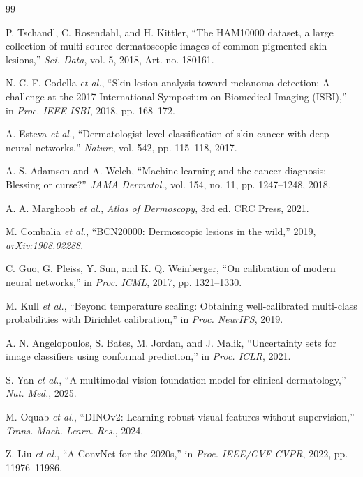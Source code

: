 \documentclass[journal]{IEEEtran}
\begin{document}
\begin{thebibliography}{99}

 P. Tschandl, C. Rosendahl, and H. Kittler, ``The HAM10000 dataset, a large collection of multi-source dermatoscopic images of common pigmented skin lesions,'' \emph{Sci. Data}, vol. 5, 2018, Art. no. 180161.

 N. C. F. Codella \emph{et al.}, ``Skin lesion analysis toward melanoma detection: A challenge at the 2017 International Symposium on Biomedical Imaging (ISBI),'' in \emph{Proc. IEEE ISBI}, 2018, pp. 168--172.

 A. Esteva \emph{et al.}, ``Dermatologist-level classification of skin cancer with deep neural networks,'' \emph{Nature}, vol. 542, pp. 115--118, 2017.

 A. S. Adamson and A. Welch, ``Machine learning and the cancer diagnosis: Blessing or curse?'' \emph{JAMA Dermatol.}, vol. 154, no. 11, pp. 1247--1248, 2018.

 A. A. Marghoob \emph{et al.}, \emph{Atlas of Dermoscopy}, 3rd ed. CRC Press, 2021.

 M. Combalia \emph{et al.}, ``BCN20000: Dermoscopic lesions in the wild,'' 2019, \emph{arXiv:1908.02288}.

 C. Guo, G. Pleiss, Y. Sun, and K. Q. Weinberger, ``On calibration of modern neural networks,'' in \emph{Proc. ICML}, 2017, pp. 1321--1330.

 M. Kull \emph{et al.}, ``Beyond temperature scaling: Obtaining well-calibrated multi-class probabilities with Dirichlet calibration,'' in \emph{Proc. NeurIPS}, 2019.

 A. N. Angelopoulos, S. Bates, M. Jordan, and J. Malik, ``Uncertainty sets for image classifiers using conformal prediction,'' in \emph{Proc. ICLR}, 2021.

 S. Yan \emph{et al.}, ``A multimodal vision foundation model for clinical dermatology,'' \emph{Nat. Med.}, 2025.

 M. Oquab \emph{et al.}, ``DINOv2: Learning robust visual features without supervision,'' \emph{Trans. Mach. Learn. Res.}, 2024.

 Z. Liu \emph{et al.}, ``A ConvNet for the 2020s,'' in \emph{Proc. IEEE/CVF CVPR}, 2022, pp. 11976--11986.


\end{thebibliography}
\end{document}

